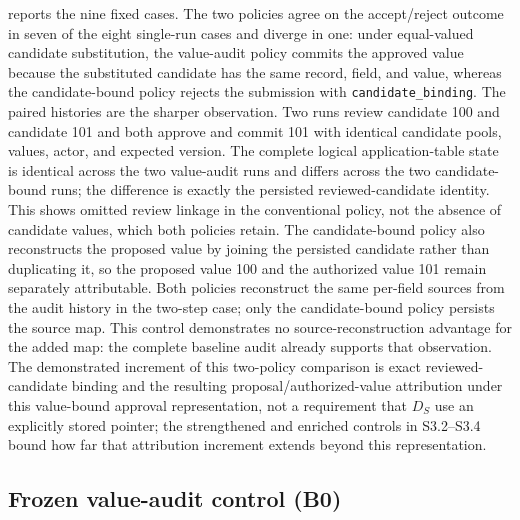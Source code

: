 \documentclass[preprint,12pt,authoryear]{elsarticle}
\newcommand{\code}[1]{\nolinkurl{#1}}
\begin{document}


 reports the nine fixed cases. The two policies
agree on the accept/reject outcome in seven of the eight single-run cases and
diverge in one: under equal-valued candidate substitution, the value-audit
policy commits the approved value because the substituted candidate has the
same record, field, and value, whereas the candidate-bound policy rejects the
submission with \code{candidate_binding}. The paired histories are the sharper
observation. Two runs review candidate 100 and candidate 101 and both approve
and commit 101 with identical candidate pools, values, actor, and expected
version. The complete logical application-table state is identical across the two
value-audit runs and differs across the two candidate-bound runs; the
difference is exactly the persisted reviewed-candidate identity. This shows
omitted review linkage in the conventional policy, not the absence of
candidate values, which both policies retain. The candidate-bound policy also
reconstructs the proposed value by joining the persisted candidate rather than
duplicating it, so the proposed value 100 and the authorized value 101 remain
separately attributable. Both policies reconstruct the same per-field sources
from the audit history in the two-step case; only the candidate-bound policy
persists the source map. This control demonstrates no source-reconstruction
advantage for the added map: the complete baseline audit already supports that
observation. The demonstrated increment of this two-policy comparison is exact
reviewed-candidate binding and the resulting proposal/authorized-value
attribution under this value-bound approval representation, not a requirement
that $D_S$ use an explicitly stored pointer; the strengthened and enriched
controls in S3.2--S3.4 bound how far that attribution increment extends beyond
this representation.

\subsection{Frozen value-audit control (B0)}
\label{app:approval-log-baseline}
\end{document}
